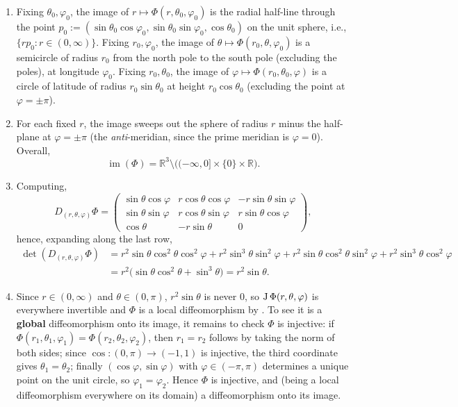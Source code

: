 \begin{exercisesolution}
\label{sol:spherical_coordinates_diffeomorphism}
\begin{enumerate}[label=\textbf{(\alph*)}]
  \item Fixing $\theta_0,\varphi_0$, the image of $r \mapsto \Phi(r,\theta_0,\varphi_0)$ is the
    radial half-line through the point $p_0 := (\sin\theta_0\cos\varphi_0,
    \sin\theta_0\sin\varphi_0, \cos\theta_0)$ on the unit sphere, i.e., $\{rp_0 : r \in
    (0,\infty)\}$. Fixing $r_0,\varphi_0$, the image of $\theta \mapsto \Phi(r_0,\theta,\varphi_0)$
    is a semicircle of radius $r_0$ from the north pole to the south pole (excluding the poles),
    at longitude $\varphi_0$. Fixing $r_0,\theta_0$, the image of $\varphi \mapsto
    \Phi(r_0,\theta_0,\varphi)$ is a circle of latitude of radius $r_0\sin\theta_0$ at height
    $r_0\cos\theta_0$ (excluding the point at $\varphi = \pm\pi$).
  \item For each fixed $r$, the image sweeps out the sphere of radius $r$ minus the half-plane
    at $\varphi = \pm\pi$ (the \emph{anti}-meridian, since the prime meridian is $\varphi = 0$).
    Overall,
    \[\operatorname{im}(\Phi) = \mathbb{R}^3\setminus\big((-\infty,0]\times\{0\}\times\mathbb{R}\big).\]
  \item Computing,
    \[D_{(r,\theta,\varphi)}\Phi = \begin{pmatrix} \sin\theta\cos\varphi & r\cos\theta\cos\varphi & -r\sin\theta\sin\varphi \\ \sin\theta\sin\varphi & r\cos\theta\sin\varphi & r\sin\theta\cos\varphi \\ \cos\theta & -r\sin\theta & 0 \end{pmatrix},\]
    hence, expanding along the last row,
    \[\begin{aligned}
    \det(D_{(r,\theta,\varphi)}\Phi) &= r^2\sin\theta\cos^2\theta\cos^2\varphi+r^2\sin^3\theta\sin^2\varphi+r^2\sin\theta\cos^2\theta\sin^2\varphi+r^2\sin^3\theta\cos^2\varphi \\
    &= r^2\big(\sin\theta\cos^2\theta+\sin^3\theta\big) = r^2\sin\theta.
    \end{aligned}\]
  \item Since $r \in (0,\infty)$ and $\theta \in (0,\pi)$, $r^2\sin\theta$ is never $0$, so
    $\operatorname{J}\Phi(r,\theta,\varphi)$ is everywhere invertible and $\Phi$ is a local diffeomorphism by
    . To see it is a \textbf{global} diffeomorphism onto its
    image, it remains to check $\Phi$ is injective: if $\Phi(r_1,\theta_1,\varphi_1) =
    \Phi(r_2,\theta_2,\varphi_2)$, then $r_1=r_2$ follows by taking the norm of both sides; since
    $\cos : (0,\pi) \to (-1,1)$ is injective, the third coordinate gives $\theta_1=\theta_2$;
    finally $(\cos\varphi,\sin\varphi)$ with $\varphi \in (-\pi,\pi)$ determines a unique point on
    the unit circle, so $\varphi_1=\varphi_2$. Hence $\Phi$ is injective, and (being a local
    diffeomorphism everywhere on its domain) a diffeomorphism onto its image.
\end{enumerate}
\end{exercisesolution}

